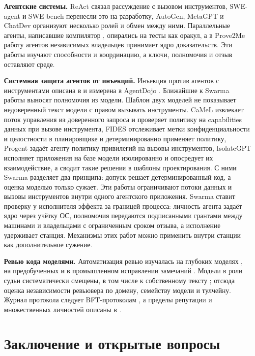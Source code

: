 \documentclass[10pt,a4paper]{article}
\begin{document}
\textbf{Агентские системы.} ReAct \cite{react} связал рассуждение с вызовом инструментов, SWE-agent \cite{sweagent} и SWE-bench \cite{swebench} перенесли это на разработку, AutoGen, MetaGPT и ChatDev \cite{autogen,metagpt,chatdev} организуют несколько ролей и обмен между ними. Параллельные агенты, написавшие компилятор \cite{compiler}, опирались на тесты как оракул, а в Prove2Me \cite{prove2me} работу агентов независимых владельцев принимает ядро доказательств. Эти работы изучают способности и координацию, а ключи, полномочия и отзыв оставляют среде.

\textbf{Системная защита агентов от инъекций.} Инъекция против агентов с инструментами описана в \cite{greshake} и измерена в AgentDojo \cite{agentdojo}. Ближайшие к Swarma работы выносят полномочия из модели. Шаблон двух моделей \cite{duallm} не показывает недоверенный текст модели с правом вызывать инструменты. CaMeL \cite{camel} извлекает поток управления из доверенного запроса и проверяет политику на capabilities данных при вызове инструмента, FIDES \cite{fides} отслеживает метки конфиденциальности и целостности в планировщике и детерминированно применяет политику, Progent \cite{progent} задаёт агенту политику привилегий на вызовы инструментов, IsolateGPT \cite{isolategpt} исполняет приложения на базе модели изолированно и опосредует их взаимодействие, а \cite{designpatterns} сводит такие решения в шаблоны проектирования. С ними Swarma разделяет два принципа: допуск решает детерминированный код, а оценка моделью только сужает. Эти работы ограничивают потоки данных и вызовы инструментов внутри одного агентского приложения. Swarma ставит проверку у исполнителя эффекта за границей процесса: личность агента задаёт ядро через учётку ОС, полномочия передаются подписанными грантами между машинами и владельцами с ограниченным сроком отзыва, а исполнение удерживает станция. Механизмы этих работ можно применить внутри станции как дополнительное сужение.

\textbf{Ревью кода моделями.} Автоматизация ревью изучалась на глубоких моделях \cite{tufano2021}, на предобученных \cite{tufano2022,codereviewer} и в промышленном исправлении замечаний \cite{frommgen2024}. Модели в роли судьи систематически смещены, в том числе к собственному тексту \cite{llmjudge,selfpref}; отсюда оценка независимости ревьювера по домену, семейству модели и тулчейну. Журнал протокола следует BFT-протоколам \cite{pbft,hotstuff}, а пределы репутации и множественных личностей описаны в \cite{sybil,sybilproof,eigentrust}.

\section{Заключение и открытые вопросы}
\end{document}
